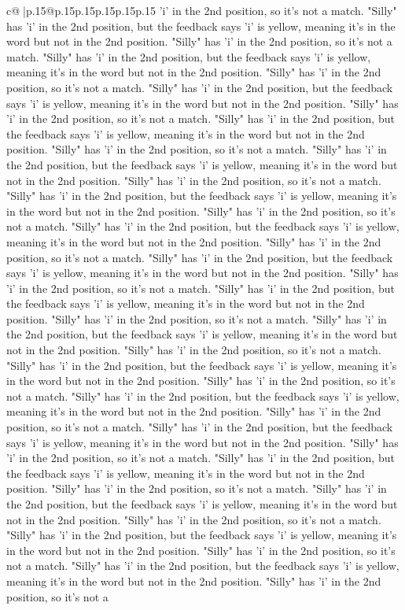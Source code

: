 \documentclass{article}
\begin{document}
{\begin{supertabular}{c@{$\;$}|p{.15\linewidth}@{}p{.15\linewidth}p{.15\linewidth}p{.15\linewidth}p{.15\linewidth}p{.15\linewidth}}
{{{'i' in the 2nd position, so it's not a match. "Silly" has 'i' in the 2nd position, but the feedback says 'i' is yellow, meaning it's in the word but not in the 2nd position. "Silly" has 'i' in the 2nd position, so it's not a match. "Silly" has 'i' in the 2nd position, but the feedback says 'i' is yellow, meaning it's in the word but not in the 2nd position. "Silly" has 'i' in the 2nd position, so it's not a match. "Silly" has 'i' in the 2nd position, but the feedback says 'i' is yellow, meaning it's in the word but not in the 2nd position. "Silly" has 'i' in the 2nd position, so it's not a match. "Silly" has 'i' in the 2nd position, but the feedback says 'i' is yellow, meaning it's in the word but not in the 2nd position. "Silly" has 'i' in the 2nd position, so it's not a match. "Silly" has 'i' in the 2nd position, but the feedback says 'i' is yellow, meaning it's in the word but not in the 2nd position. "Silly" has 'i' in the 2nd position, so it's not a match. "Silly" has 'i' in the 2nd position, but the feedback says 'i' is yellow, meaning it's in the word but not in the 2nd position. "Silly" has 'i' in the 2nd position, so it's not a match. "Silly" has 'i' in the 2nd position, but the feedback says 'i' is yellow, meaning it's in the word but not in the 2nd position. "Silly" has 'i' in the 2nd position, so it's not a match. "Silly" has 'i' in the 2nd position, but the feedback says 'i' is yellow, meaning it's in the word but not in the 2nd position. "Silly" has 'i' in the 2nd position, so it's not a match. "Silly" has 'i' in the 2nd position, but the feedback says 'i' is yellow, meaning it's in the word but not in the 2nd position. "Silly" has 'i' in the 2nd position, so it's not a match. "Silly" has 'i' in the 2nd position, but the feedback says 'i' is yellow, meaning it's in the word but not in the 2nd position. "Silly" has 'i' in the 2nd position, so it's not a match. "Silly" has 'i' in the 2nd position, but the feedback says 'i' is yellow, meaning it's in the word but not in the 2nd position. "Silly" has 'i' in the 2nd position, so it's not a match. "Silly" has 'i' in the 2nd position, but the feedback says 'i' is yellow, meaning it's in the word but not in the 2nd position. "Silly" has 'i' in the 2nd position, so it's not a match. "Silly" has 'i' in the 2nd position, but the feedback says 'i' is yellow, meaning it's in the word but not in the 2nd position. "Silly" has 'i' in the 2nd position, so it's not a match. "Silly" has 'i' in the 2nd position, but the feedback says 'i' is yellow, meaning it's in the word but not in the 2nd position. "Silly" has 'i' in the 2nd position, so it's not a match. "Silly" has 'i' in the 2nd position, but the feedback says 'i' is yellow, meaning it's in the word but not in the 2nd position. "Silly" has 'i' in the 2nd position, so it's not a match. "Silly" has 'i' in the 2nd position, but the feedback says 'i' is yellow, meaning it's in the word but not in the 2nd position. "Silly" has 'i' in the 2nd position, so it's not a match. "Silly" has 'i' in the 2nd position, but the feedback says 'i' is yellow, meaning it's in the word but not in the 2nd position. "Silly" has 'i' in the 2nd position, so it's not a }}}
\end{supertabular}}
\end{document}
